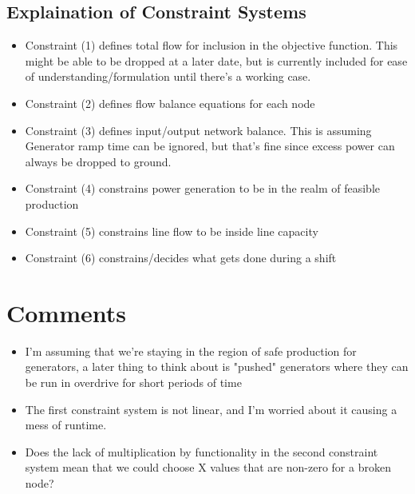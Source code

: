 \documentclass{article}
\begin{document}
\subsection{Explaination of Constraint Systems}
\begin{itemize}
	\item Constraint (1) defines total flow for inclusion in the objective function. This might be able to be dropped at a later date, but is currently included for ease of understanding/formulation until there's a working case.
	\item Constraint (2) defines flow balance equations for each node
	\item Constraint (3) defines input/output network balance. This is assuming Generator ramp time can be ignored, but that's fine since excess power can always be dropped to ground.
	\item Constraint (4) constrains power generation to be in the realm of feasible production
	\item Constraint (5) constrains line flow to be inside line capacity
	\item Constraint (6) constrains/decides what gets done during a shift
\end{itemize}
	\section{Comments}
	\begin{itemize}
		\item I'm assuming that we're staying in the region of safe production for generators, a later thing to think about is "pushed" generators where they can be run in overdrive for short periods of time
		\item The first constraint system is not linear, and I'm worried about it causing a mess of runtime.
		\item Does the lack of multiplication by functionality in the second constraint system mean that we could choose X values that are non-zero for a broken node?
	\end{itemize}
\end{document}
